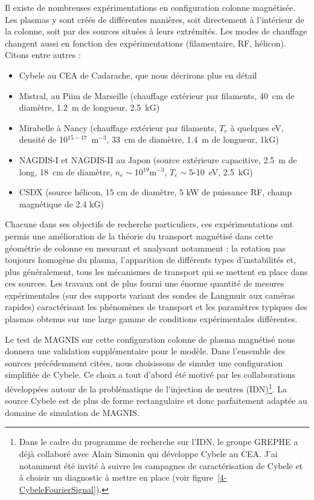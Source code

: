 \begin{refsection}
Il existe de nombreuses expérimentations en
configuration colonne magnétisée. Les plasmas y sont créés de différentes
manières, soit directement à l'intérieur de la colonne, soit par des sources situées à leurs
extrémités. Les modes de chauffage changent aussi en fonction des
expérimentations (filamentaire, RF, hélicon). Citons entre autres
:

\begin{itemize}
  \item Cybele au CEA de Cadarache, que nous décrirons plus en détail
  \item Mistral, au Piim de
  Marseille (chauffage extérieur par
  filaments, 40~cm de diamètre, 1.2~m de
  longueur, 2.5~kG)\parencite{Pierre, PierreExp, Brochard, Oldenburger}
  \item Mirabelle à Nancy (chauffage extérieur par
  filaments, $T_e$ à quelques eV, densité de
  10$^{15-17}$~m$^{-3}$, 33~cm de diamètre, 1.4~m de
  longueur, 1kG)~\parencite{Bousselin}
  \item NAGDIS-I et NAGDIS-II au Japon (source
  extérieure capacitive, 2.5~m de long, 18~cm de
  diamètre, $n_e\sim$10$^{19}$m$^{-3}$,
  $T_e\sim$5-10~eV, 2.5~kG)~\parencite{nishijimamodelling}
  \item CSDX (source hélicon, 15 cm de diamètre, 5 kW de puissance RF, champ
  magnétique de 2.4 kG)~\parencite{CSDX}
 \end{itemize}

Chacune dans ses objectifs de recherche particuliers, ces expérimentations
ont permis une amélioration de la théorie du transport magnétisé dans cette
géométrie de colonne en mesurant et analysant notamment : la rotation pas
toujours homogène du plasma, l'apparition de différents types
d'instabilités et, plus généralement, tous les mécanismes de transport qui se
mettent en place dans ces sources.
Les travaux ont de plus fourni une énorme quantité de mesures
expérimentales (sur des supports variant des sondes de Langmuir aux caméras
rapides) caractérisant les phénomènes de transport et les paramètres typiques
des plasmas obtenus sur une large gamme de conditions expérimentales
différentes.

Le test de MAGNIS sur cette configuration colonne de plasma magnétisé nous
donnera une validation supplémentaire pour le modèle. Dans l'ensemble des
sources précédemment citées, nous choisissons de simuler une configuration simplifiée de
Cybele. Ce choix a tout d'abord été motivé par les collaborations
développées autour de la problématique de l'injection
de neutres (IDN)\footnote{Dans le cadre du programme de recherche sur l'IDN,
le groupe GREPHE a déjà collaboré avec Alain Simonin qui développe Cybele au
CEA. J'ai notamment été invité à suivre les campagnes de caractérisation de
Cybele et à choisir un diagnostic à mettre en place (voir
figure~\ref{4-CybeleFourierSignal}).}.
La source Cybele est de plus de forme rectangulaire et donc parfaitement adaptée
au domaine de simulation de MAGNIS.


\end{refsection}
